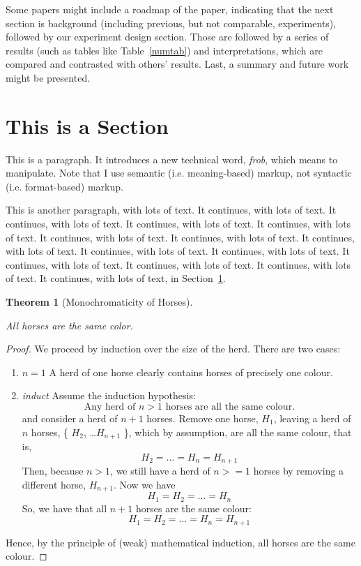 \documentclass{article}
\newcommand*{\tblref}[1]{{Table~\ref{#1}}}
\newcommand*{\secref}[1]{{Section~\ref{#1}}}
\newcommand*{\term}[1]{\textit{#1}}
\newtheorem{thm}{Theorem}
\begin{document}
Some papers might include a roadmap of the paper, indicating that the next section is background (including previous, but not comparable, experiments), followed by our experiment design section.  Those are followed by a series of results (such as tables like \tblref{numtab}) and interpretations, which are compared and contrasted with others' results.  Last, a summary and future work might be presented.

\section{This is a Section}\label{meaningless}

This is a paragraph.  It introduces a new technical word, \term{frob}, which means to manipulate.  Note that I use semantic (i.e. meaning-based) markup, not syntactic (i.e. format-based) markup.

This is another paragraph, with lots of text.
It continues, with lots of text.
It continues, with lots of text.
It continues, with lots of text.
It continues, with lots of text.
It continues, with lots of text.
It continues, with lots of text.
It continues, with lots of text.
It continues, with lots of text.
It continues, with lots of text.
It continues, with lots of text.
It continues, with lots of text.
It continues, with lots of text.
It continues, with lots of text,
in \secref{meaningless}.

\begin{thm}[Monochromaticity of Horses]\label{horseThm}

All horses are the same color.

\end{thm}
\begin{proof}
  We proceed by induction over the size of the herd.  There are two cases:
  \begin{enumerate}
    \item \emph{$n=1$} A herd of one horse clearly contains horses of precisely one colour.
    \item \emph{induct} Assume the induction hypothesis:
      \[ \textrm{Any herd of } n>1 \textrm{ horses are all the same colour.} \]
      and consider a herd of $n+1$ horses.  Remove one horse, $H_1$, leaving a herd of $n$ horses, \{ $H_2$, \ldots $H_{n+1}$ \}, which by assumption, are all the same colour, that is,
%
\[ H_2 = \ldots = H_n = H_{n+1} \]
%
Then, because $n>1$, we still have a herd of $n>=1$ horses by removing a different horse, $H_{n+1}$.  Now we have
%
\[ H_1 = H_2 = \ldots = H_n \]
%
So, we have that all $n+1$ horses are the same colour:
\[ H_1 = H_2 = \ldots = H_n = H_{n+1} \]
\end{enumerate}

\noindent Hence, by the principle of (weak) mathematical induction, all horses are the same colour.
\end{proof}
\end{document}
